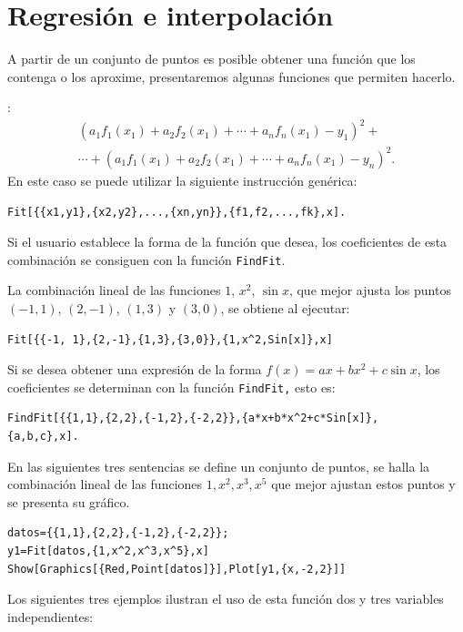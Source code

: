 \section{Regresión e interpolación}
A partir de un conjunto de puntos es posible obtener una función
que los contenga o los aproxime, presentaremos algunas funciones que permiten hacerlo.

:
\begin{multline*}
\left( a_{1}f_{1}\left( x_{1}\right) +a_{2}f_{2}\left( x_{1}\right)
+\cdots +a_{n}f_{n}\left( x_{1}\right) -y_{1}\right) ^{2}+ \\
\cdots +\left(a_{1}f_{1}\left( x_{1}\right) +a_{2}f_{2}\left( x_{1}\right) +
\cdots +a_{n}f_{n}\left( x_{1}\right) -y_{n}\right) ^{2}.
\end{multline*}
En este caso se puede utilizar la siguiente instrucción genérica:
\begin{tcolorbox}[title=Ajuste de puntos]
\begin{Verbatim}[formatcom=\letraverbatim]
Fit[{{x1,y1},{x2,y2},...,{xn,yn}},{f1,f2,...,fk},x].
\end{Verbatim}
\end{tcolorbox}
Si el usuario establece la forma de la función que desea, los coeficientes de esta combinación
se consiguen con la función \verb"FindFit".  

La combinación lineal de las funciones $1$, $x^2$, $\sin x$,
que mejor ajusta los puntos  $(-1, 1)$, $(2,-1)$, $(1,3)$ y $(3,0)$,
se obtiene al ejecutar:
\begin{tcolorbox}
\begin{Verbatim}[formatcom=\letraverbatim]
Fit[{{-1, 1},{2,-1},{1,3},{3,0}},{1,x^2,Sin[x]},x]
\end{Verbatim}
\end{tcolorbox}
Si se desea obtener una expresión de la forma $f(x)=ax+bx^2+c \sin x$,
los coeficientes se determinan con la función \verb"FindFit," esto es:
\begin{tcolorbox}
\begin{Verbatim}[formatcom=\letraverbatim]
FindFit[{{1,1},{2,2},{-1,2},{-2,2}},{a*x+b*x^2+c*Sin[x]},
{a,b,c},x].
\end{Verbatim}
\end{tcolorbox}
En las siguientes tres sentencias se define un conjunto de puntos, se halla la
combinación lineal de las funciones $1,x^{2},x^{3},x^{5}$ que mejor
ajustan estos puntos y se presenta su gráfico.
\begin{tcolorbox}
\begin{Verbatim}[formatcom=\letraverbatim]
datos={{1,1},{2,2},{-1,2},{-2,2}};
y1=Fit[datos,{1,x^2,x^3,x^5},x]
Show[Graphics[{Red,Point[datos]}],Plot[y1,{x,-2,2}]]
\end{Verbatim}
\end{tcolorbox}
Los siguientes tres ejemplos ilustran el uso de esta función dos y tres
variables independientes:

